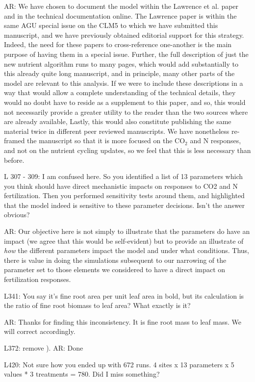 \documentclass{article}
\begin{document}
{\textsf{AR: We have chosen to document the model within the Lawrence et al. paper and in the technical documentation online. The Lawrence paper is within the same AGU special issue on the CLM5 to which we have submitted this manuscript, and we have previously obtained editorial support for this strategy. Indeed, the need for these papers to cross-reference one-another is the main purpose of having them in a special issue.  Further, the full description of just the new nutrient algorithm runs to many pages, which would add substantially to this already quite long manuscript, and in principle, many other parts of the model are relevant to this analysis. If we were to include these descriptions in a way that would allow a complete understanding of the technical details, they would no doubt have to reside as a supplement to this paper, and so,  this would not necessarily provide a greater utility to the reader than the two sources where are already available, Lastly, this would also constitute publishing the same material twice in different peer reviewed manuscripts.  We have nonetheless re-framed the manuscript so that it is more focused on the CO$_{2}$ and N responses, and not on the nutrient cycling updates, so we feel that this is less necessary than before.}

L 307 - 309: I am confused here. So you identified a list of 13 parameters which you think should have direct mechanistic impacts on responses to CO2 and N fertilization. Then you performed sensitivity tests around them, and highlighted that the model indeed is sensitive to these parameter decisions. Isn't the answer obvious? 

\textsf{AR: Our objective here is not simply to illustrate that the parameters do have an impact (we agree that this would be self-evident) but to provide an illustrate of \emph{how} the different parameters impact the model and under what conditions.  Thus, there is value in doing the simulations subsequent to our narrowing of the parameter set to those elements we considered to have a direct impact on fertilization responses. }

L341: You say it's fine root area per unit leaf area in bold, but its calculation is the ratio of fine root biomass to leaf area? What exactly is it?

\textsf{AR: Thanks for finding this inconsistency. It is fine root mass to leaf mass. We will correct accordingly}. 

L372: remove ). 
\textsf{AR: Done}

L420: Not sure how you ended up with 672 runs. 4 sites x 13 parameters x 5 values * 3 treatments = 780. Did I miss something? 

}
\end{document}

